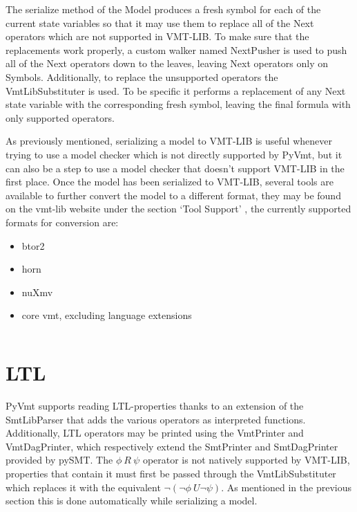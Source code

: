 The serialize method of the Model produces a fresh symbol for each of the current state variables so that it may use them to replace all of the Next operators which are not supported in VMT-LIB.
To make sure that the replacements work properly, a custom walker named NextPusher is used to push all of the Next operators down to the leaves, leaving Next operators only on Symbols.
Additionally, to replace the unsupported operators the VmtLibSubstituter is used. To be specific it performs a replacement of any Next state variable with the corresponding fresh symbol, leaving the final formula with only supported operators.

As previously mentioned, serializing a model to VMT-LIB is useful whenever trying to use a model checker which is not directly supported by PyVmt, but it can also be a step to use a model checker that doesn't support VMT-LIB in the first place.
Once the model has been serialized to VMT-LIB, several tools are available to further convert the model to a different format, they may be found on the vmt-lib website under the section `Tool Support' \cite{VMT-LIB}, the currently supported formats for conversion are:
\begin{itemize}
    \item btor2
    \item horn
    \item nuXmv
    \item core vmt, excluding language extensions
\end{itemize}

\inputminted[firstline=37, lastline=38]{python3}{py/vmtlib_support.py}

\section{LTL}
PyVmt supports reading LTL-properties thanks to an extension of the SmtLibParser that adds the various operators as interpreted functions. Additionally, LTL operators may be printed using the VmtPrinter and VmtDagPrinter, which respectively extend the SmtPrinter and SmtDagPrinter provided by pySMT. The \begin{math}\phi\ R\ \psi\end{math} operator is not natively supported by VMT-LIB, properties that contain it must first be passed through the VmtLibSubstituter which replaces it with the equivalent \begin{math}\lnot (\lnot \phi\ U \lnot \psi) \end{math}. As mentioned in the previous section this is done automatically while serializing a model.


